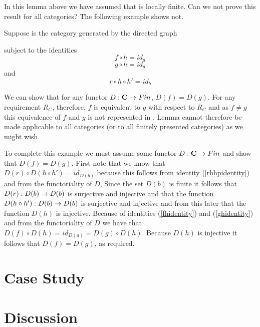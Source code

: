 \documentclass[10pt,a4paper]{article}
\theoremstyle{remark}
\begin{document}
In this lemma above we have assumed that \catcw is locally finite. Can we not prove this result for all categories? The following example shows not. 
\begin{example}
Suppose \catcw is the category generated by the directed graph

subject to the identities
\begin{equation}
\label{fhidentity}
f \circ h = id_a
\end{equation}
\begin{equation}
\label{ghidentity}
g \circ h = id_a
\end{equation}
and 
\begin{equation}
\label{rhhpidentity}
r \circ h \circ h' = id_b
\end{equation}

We can show that for any functor $D:\textbf{C} \rightarrow Fin$, $D(f)=D(g)$. For any requirement 
$R_C$, therefore, $f$ is equivalent to $g$ with respect to $R_C$ and as $f \neq g$ this equivalence of $f$ and $g$ 
is not represented in \catc. Lemma  cannot therefore be made applicable to all categories (or to all finitely presented categories) as we might wish.

To complete this example we must assume some functor $D:\textbf{C} \rightarrow Fin$ and show that $D(f)=D(g)$. 
First note that we know that $D(r) \circ D(h \circ h')=id_{D(b)}$ because this follows from
identity (\ref {rhhpidentity}) and from the functoriality of $D$, Since 
the set $D(b)$ is finite it follows that $D(r): D(b) \rightarrow D(b)$ is surjective and injective 
and that the function $D(h \circ h'):D(b) \rightarrow D(b)$ is surjective and injective and from this later
that the function $D(h)$ is injective.
Because of identities (\ref{fhidentity}) and (\ref{ghidentity}) and from the 
functoriality of $D$ we have that $D(f) \circ D(h) =id_{D(a)}=D(g) \circ D(h)$. Because $D(h)$ is injective it follows 
that $D(f)=D(g)$, as required.

\end{example}
\section{Case Study}

\section{Discussion}

\end{document}
